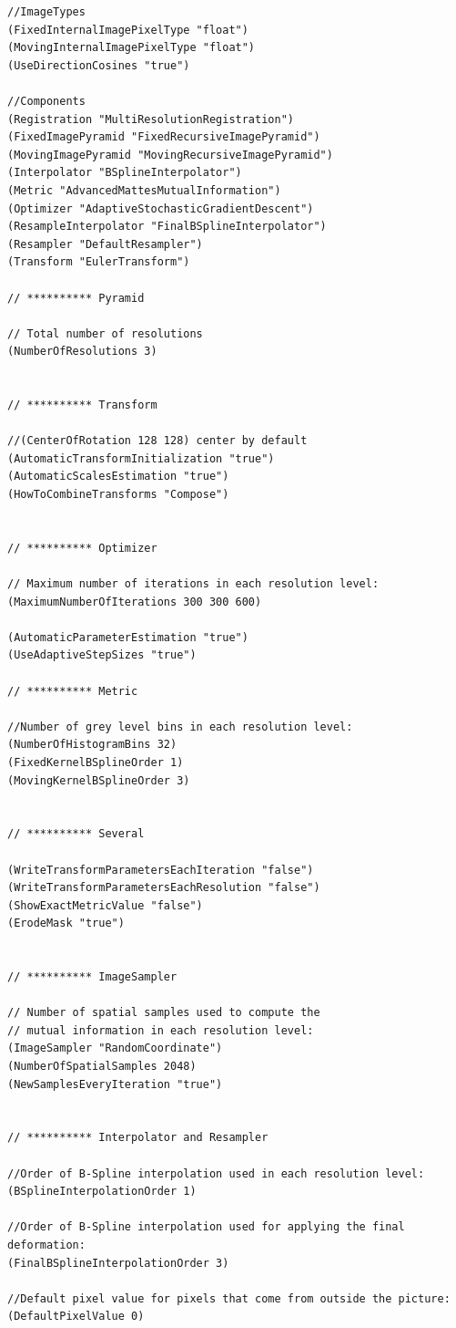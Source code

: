 \documentclass[]{report}
\begin{document}
\small
\begin{verbatim}
//ImageTypes
(FixedInternalImagePixelType "float")
(MovingInternalImagePixelType "float")
(UseDirectionCosines "true")

//Components
(Registration "MultiResolutionRegistration")
(FixedImagePyramid "FixedRecursiveImagePyramid")
(MovingImagePyramid "MovingRecursiveImagePyramid")
(Interpolator "BSplineInterpolator")
(Metric "AdvancedMattesMutualInformation")
(Optimizer "AdaptiveStochasticGradientDescent")
(ResampleInterpolator "FinalBSplineInterpolator")
(Resampler "DefaultResampler")
(Transform "EulerTransform")

// ********** Pyramid

// Total number of resolutions
(NumberOfResolutions 3)


// ********** Transform

//(CenterOfRotation 128 128) center by default
(AutomaticTransformInitialization "true")
(AutomaticScalesEstimation "true")
(HowToCombineTransforms "Compose")


// ********** Optimizer

// Maximum number of iterations in each resolution level:
(MaximumNumberOfIterations 300 300 600)

(AutomaticParameterEstimation "true")
(UseAdaptiveStepSizes "true")

// ********** Metric

//Number of grey level bins in each resolution level:
(NumberOfHistogramBins 32)
(FixedKernelBSplineOrder 1)
(MovingKernelBSplineOrder 3)


// ********** Several

(WriteTransformParametersEachIteration "false")
(WriteTransformParametersEachResolution "false")
(ShowExactMetricValue "false")
(ErodeMask "true")


// ********** ImageSampler

// Number of spatial samples used to compute the
// mutual information in each resolution level:
(ImageSampler "RandomCoordinate")
(NumberOfSpatialSamples 2048)
(NewSamplesEveryIteration "true")


// ********** Interpolator and Resampler

//Order of B-Spline interpolation used in each resolution level:
(BSplineInterpolationOrder 1)

//Order of B-Spline interpolation used for applying the final deformation:
(FinalBSplineInterpolationOrder 3)

//Default pixel value for pixels that come from outside the picture:
(DefaultPixelValue 0)
\end{verbatim}
\normalsize
\end{document}
